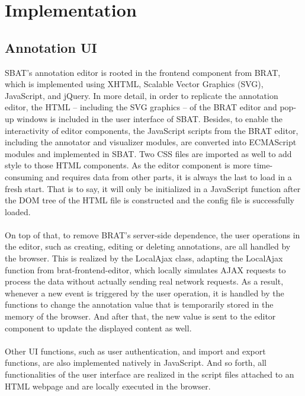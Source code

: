 \documentclass[12ptm a4paper]{article}
\begin{document}
\newpage
\section{Implementation}
\subsection{Annotation UI}
SBAT's annotation editor is rooted in the frontend component from BRAT, which is implemented using XHTML, Scalable Vector Graphics (SVG), JavaScript, and jQuery. In more detail, in order to replicate the annotation editor, the HTML -- including the SVG graphics -- of the BRAT editor and pop-up windows is included in the user interface of SBAT. Besides, to enable the interactivity of editor components, the JavaScript scripts from the BRAT editor, including the annotator and visualizer modules, are converted into ECMAScript modules and implemented in SBAT. Two CSS files are imported as well to add style to those HTML components. As the editor component is more time-consuming and requires data from other parts, it is always the last to load in a fresh start. That is to say, it will only be initialized in a JavaScript function after the DOM tree of the HTML file is constructed and the config file is successfully loaded. \\
\\
On top of that, to remove BRAT's server-side dependence, the user operations in the editor, such as creating, editing or deleting annotations, are all handled by the browser. This is realized by the LocalAjax class, adapting the LocalAjax function from brat-frontend-editor, which locally simulates AJAX requests to process the data without actually sending real network requests. As a result, whenever a new event is triggered by the user operation, it is handled by the functions to change the annotation value that is temporarily stored in the memory of the browser. And after that, the new value is sent to the editor component to update the displayed content as well.\\
\\
Other UI functions, such as user authentication, and import and export functions, are also implemented natively in JavaScript. And so forth, all functionalities of the user interface are realized in the script files attached to an HTML webpage and are locally executed in the browser.
\end{document}
